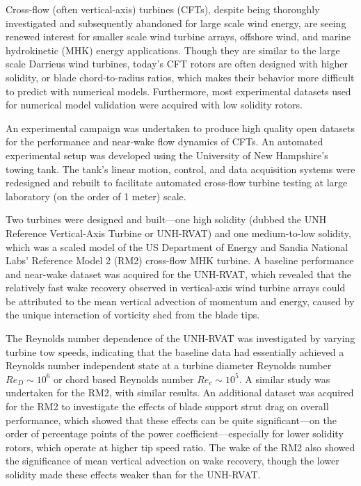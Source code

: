 \begin{Abstractpage}

\setlength{\baselineskip}{1.5\baselineskip}
{

Cross-flow (often vertical-axis) turbines (CFTs), despite being thoroughly
investigated and subsequently abandoned for large scale wind energy, are seeing
renewed interest for smaller scale wind turbine arrays, offshore wind, and
marine hydrokinetic (MHK) energy applications. Though they are similar to the
large scale Darrieus wind turbines, today's CFT rotors are often designed with
higher solidity, or blade chord-to-radius ratios, which makes their behavior
more difficult to predict with numerical models. Furthermore, most experimental
datasets used for numerical model validation were acquired with low solidity
rotors.

An experimental campaign was undertaken to produce high quality open datasets
for the performance and near-wake flow dynamics of CFTs. An automated
experimental setup was developed using the University of New Hampshire's towing
tank. The tank's linear motion, control, and data acquisition systems were
redesigned and rebuilt to facilitate automated cross-flow turbine testing at
large laboratory (on the order of 1 meter) scale.

Two turbines were designed and built---one high solidity (dubbed the UNH
Reference Vertical-Axis Turbine or UNH-RVAT) and one medium-to-low solidity,
which was a scaled model of the US Department of Energy and Sandia National
Labs' Reference Model 2 (RM2) cross-flow MHK turbine. A baseline performance and
near-wake dataset was acquired for the UNH-RVAT, which revealed that the
relatively fast wake recovery observed in vertical-axis wind turbine arrays
could be attributed to the mean vertical advection of momentum and energy,
caused by the unique interaction of vorticity shed from the blade tips.

The Reynolds number dependence of the UNH-RVAT was investigated by varying
turbine tow speeds, indicating that the baseline data had essentially achieved a
Reynolds number independent state at a turbine diameter Reynolds number $Re_D
\sim 10^6$ or chord based Reynolds number $Re_c \sim 10^5$. A similar study was
undertaken for the RM2, with similar results. An additional dataset was acquired
for the RM2 to investigate the effects of blade support strut drag on overall
performance, which showed that these effects can be quite significant---on the
order of percentage points of the power coefficient---especially for lower
solidity rotors, which operate at higher tip speed ratio. The wake of the RM2
also showed the significance of mean vertical advection on wake recovery, though
the lower solidity made these effects weaker than for the UNH-RVAT.

}
\end{Abstractpage}
